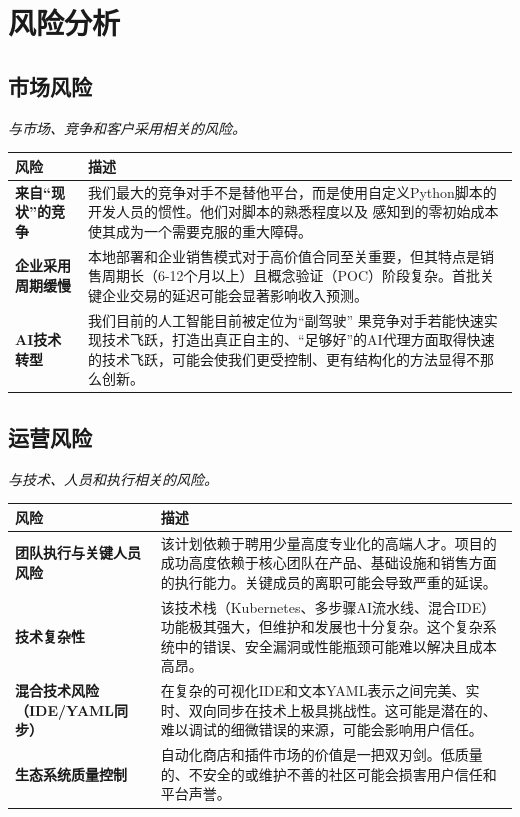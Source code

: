 \documentclass[11点, A4纸, 单面]{article}
\begin{document}
\newpage
\section{风险分析}
\subsection{市场风险}
\textit{与市场、竞争和客户采用相关的风险。}

\begin{table}[H]
\centering
\begin{tabularx}{\textwidth}{@{}lL@{}}
\toprule
\textbf{风险} & \textbf{描述} \\
\midrule
\textbf{来自“现状”的竞争} & 我们最大的竞争对手不是替他平台，而是使用自定义Python脚本的开发人员的惯性。他们对脚本的熟悉程度以及 感知到的零初始成本使其成为一个需要克服的重大障碍。 \\
\addlinespace
\textbf{企业采用周期缓慢} & 本地部署和企业销售模式对于高价值合同至关重要，但其特点是销售周期长（6-12个月以上）且概念验证（POC）阶段复杂。首批关键企业交易的延迟可能会显著影响收入预测。 \\
\addlinespace
\textbf{AI技术转型} & 我们目前的人工智能目前被定位为“副驾驶” 果竞争对手若能快速实现技术飞跃，打造出真正自主的、“足够好”的AI代理方面取得快速的技术飞跃，可能会使我们更受控制、更有结构化的方法显得不那么创新。 \\
\bottomrule
\end{tabularx}
\end{table}

\newpage
\subsection{运营风险}
\textit{与技术、人员和执行相关的风险。}

\begin{table}[H]
\centering
\begin{tabularx}{\textwidth}{@{}lL@{}}
\toprule
\textbf{风险} & \textbf{描述} \\



\midrule
\textbf{团队执行与关键人员风险} & 该计划依赖于聘用少量高度专业化的高端人才。项目的成功高度依赖于核心团队在产品、基础设施和销售方面的执行能力。关键成员的离职可能会导致严重的延误。 \\
\addlinespace
\textbf{技术复杂性} & 该技术栈（Kubernetes、多步骤AI流水线、混合IDE）功能极其强大，但维护和发展也十分复杂。这个复杂系统中的错误、安全漏洞或性能瓶颈可能难以解决且成本高昂。 \\
\addlinespace
\textbf{混合技术风险（IDE/YAML同步）} & 在复杂的可视化IDE和文本YAML表示之间完美、实时、双向同步在技术上极具挑战性。这可能是潜在的、难以调试的细微错误的来源，可能会影响用户信任。 \\
\addlinespace
\textbf{生态系统质量控制} & 自动化商店和插件市场的价值是一把双刃剑。低质量的、不安全的或维护不善的社区可能会损害用户信任和平台声誉。 \\
\bottomrule
\end{tabularx}
\end{table}
\end{document}
